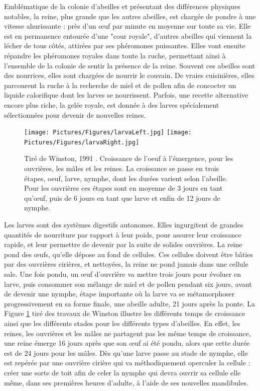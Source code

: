 			Emblématique de la colonie d'abeilles et présentant des différences physiques notables, la reine, plus grande que les autres abeilles, est chargée de pondre à une vitesse ahurissante : près d'un œuf par minute en moyenne sur toute sa vie. Elle est en permanence entourée d'une "cour royale", d'autres abeilles qui viennent la lécher de tous côtés, attirées par ses phéromones puissantes. Elles vont ensuite répandre les phéromones royales dans toute la ruche, permettant ainsi à l'ensemble de la colonie de sentir la présence de la reine. Souvent ces abeilles sont des nourrices, elles sont chargées de nourrir le couvain. De vraies cuisinières, elles parcourent la ruche à la recherche de miel et de pollen afin de concocter un liquide calorifique dont les larves se nourrissent. Parfois, une recette alternative encore plus riche, la gelée royale, est donnée à des larves spécialement sélectionnées pour devenir de nouvelles reines.
			
			\begin{figure}
			\centering
			\texttt{[image: Pictures/Figures/larvaLeft.jpg]}
			\texttt{[image: Pictures/Figures/larvaRight.jpg]}
			\caption[Tiré de Winston, 1991 \cite{winston_biology_1991}. Croissance de l'oeuf à l'émergence, pour les ouvrières, les mâles et les reines.]{Tiré de Winston, 1991 \cite{winston_biology_1991}. Croissance de l'oeuf à l'émergence, pour les ouvrières, les mâles et les reines. La croissance se passe en trois étapes, oeuf, larve, nymphe, dont les durées varient selon l'abeille. Pour les ouvrières ces étapes sont en moyenne de 3 jours en tant qu'œuf, puis de 6 jours en tant que larve et enfin de 12 jours de nymphe.}
			\label{LarvaDev}
			\end{figure}
			
			Les larves sont des systèmes digestifs autonomes. Elles ingurgitent de grandes quantités de nourriture par rapport à leur poids, pour assurer leur croissance rapide, et leur permettre de devenir par la suite de solides ouvrières. La reine pond des œufs, qu'elle dépose au fond de cellules. Ces cellules doivent être bâties par des ouvrières cirières, et nettoyées, la reine ne pond jamais dans une cellule sale. Une fois pondu, un œuf d'ouvrière va mettre trois jours pour évoluer en larve, puis consommer son mélange de miel et de pollen pendant six jours, avant de devenir une nymphe, étape importante où la larve va se métamorphoser progressivement en sa forme finale, une abeille adulte, 21 jours après la ponte. La Figure \ref{LarvaDev} tiré des travaux de Winston \cite{winston_biology_1991} illustre les différents temps de croissance ainsi que les différents stades pour les différents types d'abeilles. En effet, les reines, les ouvrières et les mâles ne partagent pas les même temps de croissance, une reine émerge 16 jours après que son œuf ai été pondu, alors que cette durée est de 24 jours pour les mâles. Dès qu'une larve passe au stade de nymphe, elle est repérée par une ouvrière cirière qui va méthodiquement operculer la cellule : créer une sorte de toit afin de celer la nymphe qui devra ouvrir sa cellule elle même, dans ses premières heures d'adulte, à l'aide de ses nouvelles mandibules.
			
